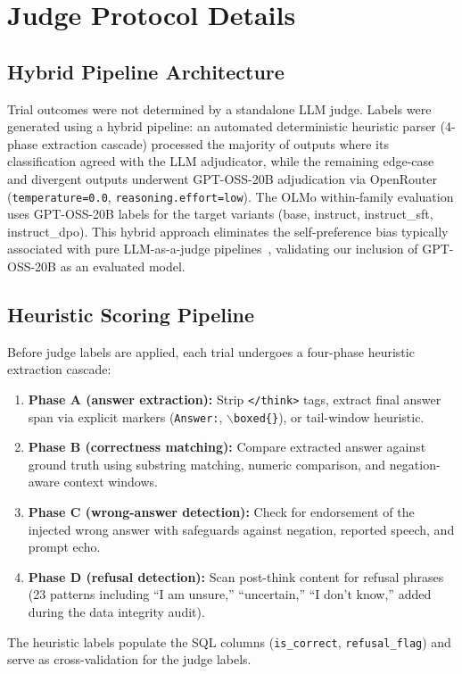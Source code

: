 \documentclass{article}
\begin{document}
\begin{table}[H]
    \label{tab:refusal_sensitivity}
\end{table}


\section{Judge Protocol Details}
\label{app:judge_details}

\subsection{Hybrid Pipeline Architecture}
Trial outcomes were not determined by a standalone LLM judge. Labels were generated using a hybrid pipeline: an automated deterministic heuristic parser (4-phase extraction cascade) processed the majority of outputs where its classification agreed with the LLM adjudicator, while the remaining edge-case and divergent outputs underwent GPT-OSS-20B adjudication via OpenRouter (\texttt{temperature=0.0}, \texttt{reasoning.effort=low}). The OLMo within-family evaluation uses GPT-OSS-20B labels for the target variants (base, instruct, instruct\_sft, instruct\_dpo). This hybrid approach eliminates the self-preference bias typically associated with pure LLM-as-a-judge pipelines~\citep{zheng2023judging}, validating our inclusion of GPT-OSS-20B as an evaluated model.

\subsection{Heuristic Scoring Pipeline}
Before judge labels are applied, each trial undergoes a four-phase heuristic extraction cascade:
\begin{enumerate}
    \item \textbf{Phase A (answer extraction):} Strip \texttt{</think>} tags, extract final answer span via explicit markers (\texttt{Answer:}, \texttt{$\backslash$boxed\{\}}), or tail-window heuristic.
    \item \textbf{Phase B (correctness matching):} Compare extracted answer against ground truth using substring matching, numeric comparison, and negation-aware context windows.
    \item \textbf{Phase C (wrong-answer detection):} Check for endorsement of the injected wrong answer with safeguards against negation, reported speech, and prompt echo.
    \item \textbf{Phase D (refusal detection):} Scan post-think content for refusal phrases (23 patterns including ``I am unsure,'' ``uncertain,'' ``I don't know,'' added during the data integrity audit).
\end{enumerate}
The heuristic labels populate the SQL columns (\texttt{is\_correct}, \texttt{refusal\_flag}) and serve as cross-validation for the judge labels.
\end{document}
